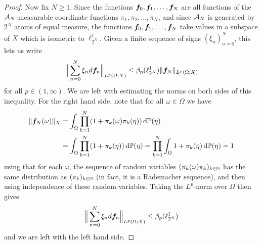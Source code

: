 \begin{proof}
  Now fix $N \geq 1$.
  Since the functions $\bm{f}_{0}, \bm{f}_{1}, \ldots, \bm{f}_{N}$ are all functions of the $\mathcal{A}_{N}$-measurable coordinate functions $\pi_{1}, \pi_{2}, \ldots, \pi_{N}$, and since $\mathcal{A}_{N}$ is generated by $2^{N}$ atoms of equal measure, the functions $\bm{f}_{0}, \bm{f}_{1}, \ldots, \bm{f}_{N}$ take values in a subspace of $X$ which is isometric to $\ell^1_{2^{N}}$.
  Given a finite sequence of signs $(\xi_{n})_{n=0}^{N}$, this lets us write
  \begin{equation}\label{eq:L1-notUMD-est1}
    \Big\| \sum_{n=0}^{N} \xi_{n} d\bm{f}_{n} \Big\|_{L^p(\Omega;X)} \leq \beta_{p}(\ell^{1}_{2^N}) \| \bm{f}_{N} \|_{L^p(\Omega;X)}
  \end{equation}
  for all $p \in (1,\infty)$.
  We are left with estimating the norms on borh sides of this inequality.
  For the right hand side, note that for all $\omega \in \Omega$ we have
  \begin{equation*}
    \begin{aligned}
      \|\bm{f}_{N}(\omega)\|_{X}
      &= \int_{\Omega} \prod_{k=1}^{N} (1 + \pi_{k}(\omega) \pi_{k}(\eta)) \, \mathrm{d}\mathbb{P}(\eta) \\
      &= \int_{\Omega} \prod_{k=1}^{N} (1 + \pi_{k}(\eta))\, \mathrm{d}\mathbb{P}(\eta) 
      = \prod_{k=1}^{N} \int_{\Omega} 1 + \pi_{k}(\eta) \, \mathrm{d}\mathbb{P}(\eta) = 1
    \end{aligned}
  \end{equation*}
  using that for each $\omega$, the sequence of random variables $(\pi_{k}(\omega) \pi_{k})_{k \in \mathbb{N}}$ has the same distribution as $(\pi_{k})_{k \in \mathbb{N}}$ (in fact, it is a Rademacher sequence), and then using independence of these random variables.
  Taking the $L^p$-norm over $\Omega$ then gives
  \begin{equation*}
    \Big\| \sum_{n=0}^{N} \xi_{n} d\bm{f}_{n} \Big\|_{L^p(\Omega;X)} \leq \beta_{p}(\ell^{1}_{2^N})
  \end{equation*}
  and we are left with the left hand side.
  

\end{proof}
